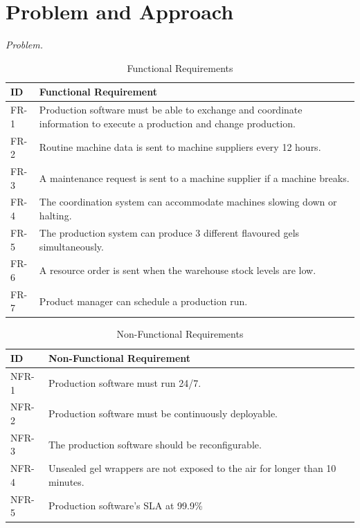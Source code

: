 \documentclass[conference]{IEEEtran}
\begin{document}
\section{Problem and Approach}

\label{sec:problem}
\emph{Problem.}
\begin{table}[htbp]
  \centering
  \caption{Functional Requirements}
  \label{tab:functional_requirements}
  \footnotesize
  \renewcommand{\arraystretch}{1.3}
  \begin{tabularx}{\columnwidth}{|U|B|}
    \hline
    \textbf{ID} & \textbf{Functional Requirement} \\ \hline
    FR-1 & Production software must be able to exchange and coordinate information to execute a production and change production. \\ \hline
    FR-2 & Routine machine data is sent to machine suppliers every 12 hours. \\ \hline
    FR-3 & A maintenance request is sent to a machine supplier if a machine breaks. \\ \hline
    FR-4 & The coordination system can accommodate machines slowing down or halting. \\ \hline
    FR-5 & The production system can produce 3 different flavoured gels simultaneously. \\ \hline
    FR-6 & A resource order is sent when the warehouse stock levels are low. \\ \hline
    FR-7 & Product manager can schedule a production run. \\ \hline
  \end{tabularx}
\end{table}

\begin{table}[htbp]
  \centering
  \caption{Non-Functional Requirements}
  \label{tab:non_functional_requirements}
  \footnotesize
  \renewcommand{\arraystretch}{1.3}
  \begin{tabularx}{\columnwidth}{|U|B|}
    \hline
    \textbf{ID} & \textbf{Non-Functional Requirement} \\ \hline
    NFR-1 & Production software must run 24/7. \\ \hline
    NFR-2 & Production software must be continuously deployable. \\ \hline
    NFR-3 & The production software should be reconfigurable. \\ \hline
    NFR-4 & Unsealed gel wrappers are not exposed to the air for longer than 10 minutes. \\ \hline
    NFR-5 & Production software’s SLA at 99.9\% \\ \hline
  \end{tabularx}
\end{table}
\end{document}
